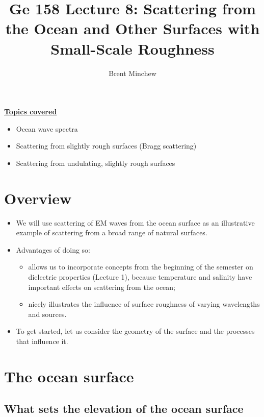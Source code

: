 \documentclass[11pt, oneside]{article}
\title{Ge 158 Lecture 8: Scattering from the Ocean and Other Surfaces with Small-Scale Roughness}
\author{Brent Minchew}
\date{}
\begin{document}
\maketitle

\noindent\underline{\textbf{Topics covered}}
\begin{itemize}
	\item Ocean wave spectra
	\item Scattering from slightly rough surfaces (Bragg scattering)
	\item Scattering from undulating, slightly rough surfaces
\end{itemize}

\section{Overview}

\begin{itemize}
	\item We will use scattering of EM waves from the ocean surface as an illustrative example of scattering from a broad range of natural surfaces.
	\item Advantages of doing so:
	\begin{itemize}
		\item allows us to incorporate concepts from the beginning of the semester on dielectric properties (Lecture 1), because temperature and salinity have important effects on scattering from the ocean;
		\item nicely illustrates the influence of surface roughness of varying wavelengths and sources.
	\end{itemize}
	\item To get started, let us consider the geometry of the surface and the processes that influence it.
\end{itemize}

\section{The ocean surface}
\label{s:ocean}

\subsection{What sets the elevation of the ocean surface}
\end{document}
